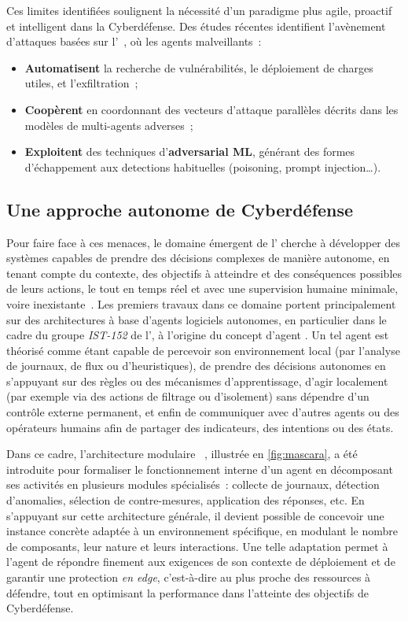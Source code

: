 Ces limites identifiées soulignent la nécessité d'un paradigme plus agile, proactif et intelligent dans la Cyberdéfense. Des études récentes identifient l'avènement d'attaques basées sur l'~\cite{Miles2018,AutoAttacker2024,Falong2025}, où les agents malveillants~:
\begin{itemize}
  \item \textbf{Automatisent} la recherche de vulnérabilités, le déploiement de charges utiles, et l'exfiltration~;
  \item \textbf{Coopèrent} en coordonnant des vecteurs d'attaque parallèles décrits dans les modèles de multi-agents adverses~;
  \item \textbf{Exploitent} des techniques d'\textbf{adversarial ML}, générant des formes d'échappement aux detections habituelles (poisoning, prompt injection…).
\end{itemize}

\subsection*{Une approche autonome de Cyberdéfense}

Pour faire face à ces menaces, le domaine émergent de l' cherche à développer des systèmes capables de prendre des décisions complexes de manière autonome, en tenant compte du contexte, des objectifs à atteindre et des conséquences possibles de leurs actions, le tout en temps réel et avec une supervision humaine minimale, voire inexistante~\cite{Vyas2023}. Les premiers travaux dans ce domaine portent principalement sur des architectures à base d'agents logiciels autonomes, en particulier dans le cadre du groupe \textit{IST-152} de l', à l'origine du concept d'agent .
Un tel agent est théorisé comme étant capable de percevoir son environnement local (par l'analyse de journaux, de flux ou d'heuristiques), de prendre des décisions autonomes en s'appuyant sur des règles ou des mécanismes d'apprentissage, d'agir localement (par exemple via des actions de filtrage ou d'isolement) sans dépendre d'un contrôle externe permanent, et enfin de communiquer avec d'autres agents ou des opérateurs humains afin de partager des indicateurs, des intentions ou des états.

Dans ce cadre, l'architecture modulaire ~\cite{Theron2020MASCARA}, illustrée en \autoref{fig:mascara}, a été introduite pour formaliser le fonctionnement interne d'un agent  en décomposant ses activités en plusieurs modules spécialisés~: collecte de journaux, détection d'anomalies, sélection de contre-mesures, application des réponses, etc. En s'appuyant sur cette architecture générale, il devient possible de concevoir une instance concrète adaptée à un environnement spécifique, en modulant le nombre de composants, leur nature et leurs interactions. Une telle adaptation permet à l'agent  de répondre finement aux exigences de son contexte de déploiement et de garantir une protection {\em en edge}, c'est-à-dire au plus proche des ressources à défendre, tout en optimisant la performance dans l'atteinte des objectifs de Cyberdéfense.

